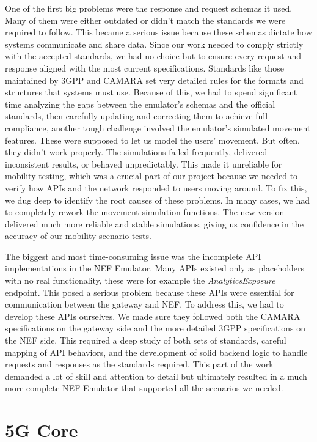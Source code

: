 One of the first big problems were the response and request schemas it used.
Many of them were either outdated or didn’t match the standards we were
required to follow. This became a serious issue because these schemas dictate
how systems communicate and share data. Since our work needed to comply
strictly with the accepted standards, we had no choice but to ensure every
request and response aligned with the most current specifications. Standards
like those maintained by 3GPP and CAMARA set very detailed rules for the
formats and structures that systems must use. Because of this, we had to spend
significant time analyzing the gaps between the emulator’s schemas and the
official standards, then carefully updating and correcting them to achieve full
compliance, another tough challenge involved the emulator's simulated movement
features. These were supposed to let us model the users' movement. But often,
they didn’t work properly. The simulations failed frequently, delivered
inconsistent results, or behaved unpredictably. This made it unreliable for
mobility testing, which was a crucial part of our project because we needed to
verify how APIs and the network responded to users moving around. To fix this,
we dug deep to identify the root causes of these problems. In many cases, we
had to completely rework the movement simulation functions. The new version
delivered much more reliable and stable simulations, giving us confidence in
the accuracy of our mobility scenario tests.

The biggest and most time-consuming issue was the incomplete API
implementations in the NEF Emulator. Many APIs existed only as placeholders
with no real functionality, these were for example the \emph{AnalyticsExposure}
endpoint. This posed a serious problem because these APIs were essential for
communication between the gateway and NEF. To address this, we had to develop
these APIs ourselves. We made sure they followed both the CAMARA specifications
on the gateway side and the more detailed 3GPP specifications on the NEF side.
This required a deep study of both sets of standards, careful mapping of API
behaviors, and the development of solid backend logic to handle requests and
responses as the standards required. This part of the work demanded a lot of
skill and attention to detail but ultimately resulted in a much more complete
NEF Emulator that supported all the scenarios we needed.

\section{5G Core}

